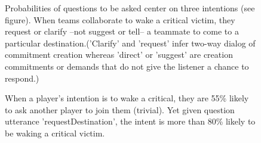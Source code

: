 \begin{figure}[h!]
    \centering
    \caption{Probabilities of questions to be asked center on three intentions (see figure). When teams collaborate to wake a critical victim, they request or clarify --not suggest or tell-- a teammate to come to a particular destination.('Clarify' and 'request' infer two-way dialog of commitment creation whereas 'direct' or 'suggest' are creation commitments or demands that do not give the listener a chance to respond.)}
\end{figure}

\begin{figure}[h!]
    \centering
    \caption{When a player's intention is to
        wake a critical, they are 55\% likely to ask another player to join
        them (trivial). Yet given question utterance 'requestDestination', the intent is more than 80\% likely to be waking a critical victim. }
\end{figure}


